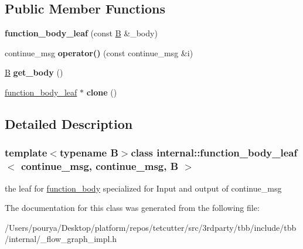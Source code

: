 \subsection*{Public Member Functions}
\begin{DoxyCompactItemize}
\item 
\hypertarget{classinternal_1_1function__body__leaf_3_01continue__msg_00_01continue__msg_00_01B_01_4_a9c8472f722a63cfa9d6df7d064203699}{}{\bfseries function\+\_\+body\+\_\+leaf} (const \hyperlink{classB}{B} \&\+\_\+body)\label{classinternal_1_1function__body__leaf_3_01continue__msg_00_01continue__msg_00_01B_01_4_a9c8472f722a63cfa9d6df7d064203699}

\item 
\hypertarget{classinternal_1_1function__body__leaf_3_01continue__msg_00_01continue__msg_00_01B_01_4_aefc65d7ac1d71dd849e77079a46c2c16}{}continue\+\_\+msg {\bfseries operator()} (const continue\+\_\+msg \&i)\label{classinternal_1_1function__body__leaf_3_01continue__msg_00_01continue__msg_00_01B_01_4_aefc65d7ac1d71dd849e77079a46c2c16}

\item 
\hypertarget{classinternal_1_1function__body__leaf_3_01continue__msg_00_01continue__msg_00_01B_01_4_aef31a1a95ef0ae202456349ba32fb3ac}{}\hyperlink{classB}{B} {\bfseries get\+\_\+body} ()\label{classinternal_1_1function__body__leaf_3_01continue__msg_00_01continue__msg_00_01B_01_4_aef31a1a95ef0ae202456349ba32fb3ac}

\item 
\hypertarget{classinternal_1_1function__body__leaf_3_01continue__msg_00_01continue__msg_00_01B_01_4_a38e2edc1945607c1809dc787d29941b9}{}\hyperlink{classinternal_1_1function__body__leaf}{function\+\_\+body\+\_\+leaf} $\ast$ {\bfseries clone} ()\label{classinternal_1_1function__body__leaf_3_01continue__msg_00_01continue__msg_00_01B_01_4_a38e2edc1945607c1809dc787d29941b9}

\end{DoxyCompactItemize}


\subsection{Detailed Description}
\subsubsection*{template$<$typename B$>$class internal\+::function\+\_\+body\+\_\+leaf$<$ continue\+\_\+msg, continue\+\_\+msg, B $>$}

the leaf for \hyperlink{classinternal_1_1function__body}{function\+\_\+body} specialized for Input and output of continue\+\_\+msg 

The documentation for this class was generated from the following file\+:\begin{DoxyCompactItemize}
\item 
/\+Users/pourya/\+Desktop/platform/repos/tetcutter/src/3rdparty/tbb/include/tbb/internal/\+\_\+flow\+\_\+graph\+\_\+impl.\+h\end{DoxyCompactItemize}
